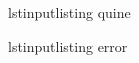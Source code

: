 \documentclass{beamer}
\begin{document}
\begin{frame}[fragile]{lstinputlisting quine}
  
\end{frame}

\begin{frame}[fragile]{lstinputlisting error}
  
\end{frame}
\end{document}
